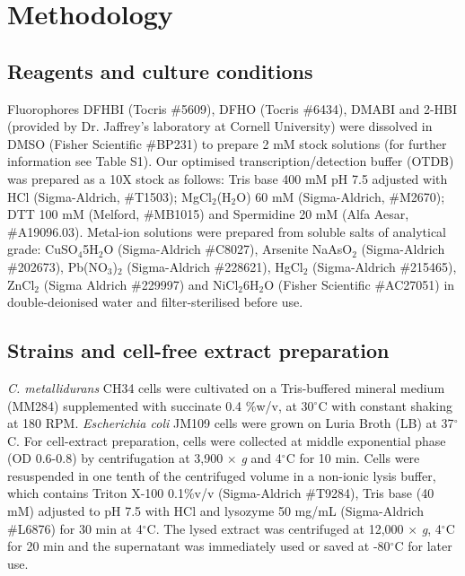 \section{\textbf{Methodology }}

\subsection*{Reagents and culture conditions}
Fluorophores DFHBI (Tocris \#5609), DFHO (Tocris \#6434), DMABI and 2-HBI (provided by Dr. Jaffrey's laboratory at Cornell University) were dissolved in DMSO (Fisher Scientific \#BP231) to prepare 2 mM stock solutions (for further information see Table S1).
Our optimised transcription/detection buffer (OTDB) was prepared as a 10X stock as follows: Tris base 400 mM pH 7.5 adjusted with HCl (Sigma-Aldrich, \#T1503); MgCl$_2$(H$_2$O) 60 mM (Sigma-Aldrich, \#M2670); DTT 100 mM (Melford, \#MB1015) and Spermidine 20 mM (Alfa Aesar, \#A19096.03). 
Metal-ion solutions were prepared from soluble salts of analytical grade: CuSO$_4$\textperiodcentered5H$_2$O (Sigma-Aldrich \#C8027), Arsenite NaAsO$_2$ (Sigma-Aldrich \#202673), Pb(NO$_3$)$_2$ (Sigma-Aldrich \#228621), HgCl$_2$ (Sigma-Aldrich \#215465), ZnCl$_2$ (Sigma Aldrich \#229997) and NiCl$_2$\textperiodcentered6H$_2$O (Fisher Scientific \#AC27051) in double-deionised water and filter-sterilised before use. 


\subsection*{Strains and cell-free extract preparation}

\textit{C. metallidurans} CH34 cells were cultivated on a Tris-buffered mineral medium (MM284) \cite{20} supplemented with succinate 0.4 \%w/v, at 30$^{\circ}$C with constant shaking at 180 RPM. \textit{Escherichia coli} JM109 cells were grown on Luria Broth (LB) at 37$^{\circ}$C. 
For cell-extract preparation, cells were collected at middle exponential phase (OD 0.6-0.8) by centrifugation at 3,900 $\times$ \textit{g} and 4$^{\circ}$C for 10 min. Cells were resuspended in one tenth of the centrifuged volume in a non-ionic lysis buffer, which contains Triton X-100 0.1\%v/v (Sigma-Aldrich \#T9284), Tris base (40 mM) adjusted to pH 7.5 with HCl and lysozyme 50 mg/mL (Sigma-Aldrich \#L6876) for 30 min at 4$^{\circ}$C.
The lysed extract was centrifuged at 12,000 $\times$ \textit{g}, 4$^{\circ}$C for 20 min and the supernatant was immediately used or saved at -80$^{\circ}$C for later use.

